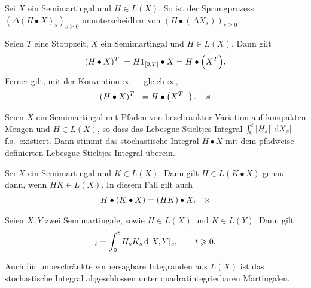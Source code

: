 \begin{theorem}
\label{prop:4.18}
Sei $X$ ein Semimartingal und $H \in L(X)$. So ist der
  Sprungprozess $\left( \Delta (H\bullet X)_s \right)_{s\ge 0}$
  ununterscheidbar von $\left(H\bullet (\Delta X_s) \right)_{s\ge 0} $.
\end{theorem}

\begin{theorem}
\label{prop:4.19}
Seien $T$ eine Stoppzeit, $X$ ein Semimartingal und $H \in
  L(X)$. Dann gilt
\begin{align*}
(H \bullet X)^T \;= H1_{[0,T]} \bullet X = H \bullet \Bigl(X^T\Bigr).
\end{align*}
Ferner gilt, mit der Konvention $\infty-$ gleich $\infty$,
\begin{align*}
(H \bullet X)^{T-} = H \bullet \left(X^{T-}\right).\fish
\end{align*}
\end{theorem}

\begin{theorem}
\label{prop:4.20}
  Seien $X$ ein Semimartingal mit Pfaden von beschränkter Variation auf
  kompakten Mengen und $H \in L(X)$, so dass das Lebesgue-Stieltjes-Integral
  $\int_0^t |H_s| |\,\mathrm{d} X_s| $ f.s.\ existiert. Dann stimmt das stochastische
  Integral  $H \bullet X$ mit dem
  pfadweise definierten Lebesgue-Stieltjes-Integral überein.\fish
\end{theorem}

\begin{theorem}[Assoziativität]
\label{prop:4.21}
  Sei $X$ ein Semimartingal und $K \in L(X)$. Dann gilt $H\in L(K\bullet X)$
  genau dann, wenn $HK \in L(X)$. In diesem Fall gilt auch
\begin{align*}
H \bullet (K \bullet X) = (HK) \bullet X.\fish
\end{align*}
\end{theorem}

\begin{theorem}
\label{prop:4.22}
Seien $X,Y$ zwei Semimartingale, sowie $H \in L(X)$ und $K \in L(Y)$. Dann gilt
\begin{align*}
[H \bullet X, K \bullet Y]_t  = \int_0^t H_sK_s\,\diffd[X,Y]_s,\qquad t\ge 0.
\end{align*}
\end{theorem}

Auch für unbeschränkte vorhersagbare Integranden aus $L(X)$ ist das
stochastische Integral abgeschlossen unter quadratintegrierbaren Martingalen.

